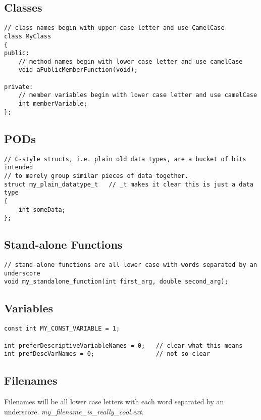 \documentclass{article}
\begin{document}
\subsection{Classes}
\begin{verbatim}
// class names begin with upper-case letter and use CamelCase
class MyClass
{
public:
    // method names begin with lower case letter and use camelCase
    void aPublicMemberFunction(void);

private:
    // member variables begin with lower case letter and use camelCase
    int memberVariable;
};
\end{verbatim}

\subsection{PODs}
\begin{verbatim}
// C-style structs, i.e. plain old data types, are a bucket of bits intended
// to merely group similar pieces of data together.
struct my_plain_datatype_t   // _t makes it clear this is just a data type
{
    int someData;
};
\end{verbatim}

\subsection{Stand-alone Functions}
\begin{verbatim}
// stand-alone functions are all lower case with words separated by an underscore
void my_standalone_function(int first_arg, double second_arg);
\end{verbatim}

\subsection{Variables}
\begin{verbatim}
const int MY_CONST_VARIABLE = 1;

int preferDescriptiveVariableNames = 0;   // clear what this means
int prefDescVarNames = 0;                 // not so clear
\end{verbatim}

\subsection{Filenames}
Filenames will be all lower case letters with each word separated by an underscore. \textit{my\_filename\_is\_really\_cool.ext}.
\end{document}
